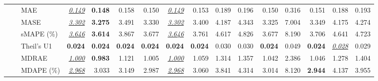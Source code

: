 \begin{table}[!htbp]
{\begin{tabular}{lllrrrrrrrrrrrrr}
 &  & MAE & \underline{\textit{0.149}} & \textbf{0.148} & 0.158 & 0.150 & \underline{\textit{0.149}} & 0.153 & 0.189 & 0.196 & 0.150 & 0.316 & 0.151 & 0.188 & 0.193 \\
 &  & MASE & \underline{\textit{3.302}} & \textbf{3.275} & 3.491 & 3.330 & \underline{\textit{3.302}} & 3.400 & 4.187 & 4.343 & 3.325 & 7.004 & 3.349 & 4.175 & 4.274 \\
 &  & sMAPE (\%) & \underline{\textit{3.646}} & \textbf{3.614} & 3.867 & 3.677 & \underline{\textit{3.646}} & 3.761 & 4.617 & 4.826 & 3.677 & 8.190 & 3.706 & 4.641 & 4.723 \\
 &  & Theil's U1 & \textbf{0.024} & \textbf{0.024} & \textbf{0.024} & \textbf{0.024} & \textbf{0.024} & \textbf{0.024} & 0.030 & 0.030 & \textbf{0.024} & 0.049 & \textbf{0.024} & \underline{\textit{0.028}} & 0.029 \\
 &  & MDRAE & \underline{\textit{1.000}} & \textbf{0.983} & 1.121 & 1.005 & \underline{\textit{1.000}} & 1.059 & 1.314 & 1.357 & 1.042 & 2.386 & 1.046 & 1.278 & 1.404 \\
 &  & MDAPE (\%) & \underline{\textit{2.968}} & 3.033 & 3.149 & 2.987 & \underline{\textit{2.968}} & 3.060 & 3.841 & 4.314 & 3.014 & 8.120 & \textbf{2.944} & 4.137 & 3.955 \\
\bottomrule
\end{tabular}}
\end{table}